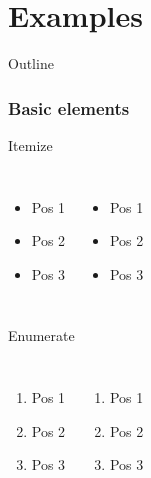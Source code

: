 

\subtitle{Number and name of presentation}

  	\maketitle
	\part{Examples}
	\begin{frame}{Outline}
		\tableofcontents[pausesections]
	\end{frame}
	\section{Basic elements}
	\begin{frame}{Itemize}
		\begin{columns}
				\begin{itemize}
					\item Pos 1
					\item Pos 2
					\item Pos 3
				\end{itemize}
				\pause
				\begin{itemize}[<+->]
					\item Pos 1
					\item Pos 2
					\item Pos 3
				\end{itemize}
				\onslide
		\end{columns}
	\end{frame}
	\begin{frame}{Enumerate}
		\begin{columns}
			\column{0.5\textwidth}
				\begin{enumerate}
					\item Pos 1
					\item Pos 2
					\item Pos 3
				\end{enumerate}
			\column{0.5\textwidth}
				\pause
				\begin{enumerate}[<+->]
					\item Pos 1
					\item Pos 2
					\item Pos 3
				\end{enumerate}
				\onslide
		\end{columns}
	\end{frame}

